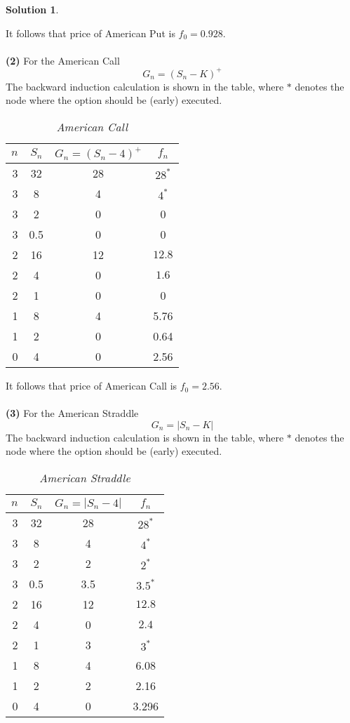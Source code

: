 \documentclass[a4paper, 10pt]{article}
\renewcommand{\arraystretch}{1.4}
\theoremstyle{definition}
\theoremstyle{hSol}
\newtheorem*{solution}{Solution}
\begin{document}
\begin{solution}
\begin{table}[h]
\label{tab:put}
\end{table}
It follows that price of American Put is $f_0 = 0.928$. \\
~\\
\textbf{(2)} For the American Call
$$
G_n = (S_n-K)^+
$$
The backward induction calculation is shown in the table, where $*$ denotes the node where the option should be (early) executed.
\begin{table}[h]
\vspace{-10pt}
\caption{\textit{American Call}}
\vspace{3pt}
\centering
\def\arraystretch{1.15}
\begin{tabular}{|r|ccc|}
\hline
$n$ & $S_n$ & $G_n=(S_n-4)^+$ & $f_n$\\ 
\hline
3 & 32 & 28 & $28^*$\\
3 & 8 & 4& $4^*$\\
3 & 2 & 0 & 0\\
3 & 0.5 & 0 & 0\\
\hline
2 & 16 & 12 & $12.8$\\
2 & 4 & 0& $1.6$\\
2 & 1 & 0 & 0\\
\hline
1 & 8 & 4 & 5.76\\
1 & 2 & 0 & 0.64\\
\hline 
0 & 4 & 0 & 2.56\\
\hline
\end{tabular}
\label{tab:call}
\end{table}
It follows that price of American Call is $f_0 = 2.56$. \\
~\\
\textbf{(3)} For the American Straddle
$$
G_n = |S_n-K|
$$
The backward induction calculation is shown in the table, where $*$ denotes the node where the option should be (early) executed.
\begin{table}[H]
\vspace{-10pt}
\caption{\textit{American Straddle}}
\vspace{3pt}
\centering
\def\arraystretch{1.15}
\begin{tabular}{|r|ccc|}
\hline
$n$ & $S_n$ & $G_n=|S_n-4|$ & $f_n$\\ 
\hline
3 & 32 & 28 & $28^*$\\
3 & 8 & 4& $4^*$\\
3 & 2 & 2 & $2^*$\\
3 & 0.5 & 3.5 & $3.5^*$\\
\hline
2 & 16 & 12 & $12.8$\\
2 & 4 & 0& $2.4$\\
2 & 1 & 3 & $3^*$\\
\hline
1 & 8 & 4 & 6.08\\
1 & 2 & 2 & 2.16\\
\hline 
0 & 4 & 0 & 3.296\\
\hline
\end{tabular}
\label{tab:call}
\end{table}
\end{solution}
\end{document}
